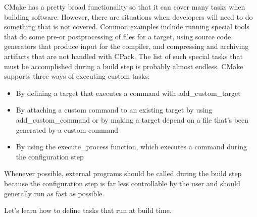 CMake has a pretty broad functionality so that it can cover many tasks when building software. However, there are situations when developers will need to do something that is not covered. Common examples include running special tools that do some pre-or postprocessing of files for a target, using source code generators that produce input for the compiler, and compressing and archiving artifacts that are not handled with CPack. The list of such special tasks that must be accomplished during a build step is probably almost endless. CMake supports three ways of executing custom tasks:

\begin{itemize}
\item 
By defining a target that executes a command with add\_custom\_target

\item 
By attaching a custom command to an existing target by using add\_custom\_command or by making a target depend on a file that's been generated by a custom command

\item 
By using the execute\_process function, which executes a command during the configuration step
\end{itemize}

Whenever possible, external programs should be called during the build step because the configuration step is far less controllable by the user and should generally run as fast as possible.

Let's learn how to define tasks that run at build time.